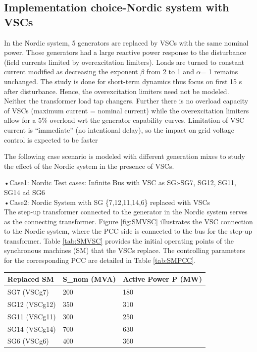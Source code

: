\documentclass{report}
\begin{document}
\subsection{Implementation choice-Nordic system with VSCs}
In the Nordic system, 5 generators are replaced by VSCs with the same nominal power. Those generators had a large reactive power response to the disturbance (field currents limited by overexcitation limiters).  Loads are turned to constant current modified as decreasing the exponent $\beta$  from 2 to 1 and $\alpha$= 1 remains unchanged. The study is done for short-term dynamics thus focus on first 15 s after disturbance. Hence, the overexcitation limiters need not be modeled. Neither the transformer load tap changers. Further there is no overload capacity of VSCs (maximum current = nominal current) while the overexcitation limiters allow for a 5\% overload wrt the generator capability curves. Limitation of VSC current is “immediate” (no intentional delay), so the impact on grid voltage control is expected to be faster

The following case scenario is modeled with different generation mixes to study the effect of the Nordic system in the presence of VSCs.

•Case1: Nordic Test cases: Infinite Bus with VSC as SG:-SG7, SG12, SG11, SG14 ad SG6\\
•Case2: Nordic System with SG \{7,12,11,14,6\} replaced with VSCs\\

The step-up transformer connected to the generator in the Nordic system serves as the connecting transformer. Figure \ref{fig:SMVSC} illustrates the VSC connection to the Nordic system, where the PCC side is connected to the bus for the step-up transformer. Table \ref{tab:SMVSC} provides the initial operating points of the synchronous machines (SM) that the VSCs replace. The controlling parameters for the corresponding PCC are detailed in Table \ref{tab:SMPCC}.
\begin{table}[H]
\centering
\begin{tabular}{|l |l |l|}
\hline
Replaced SM & S\_nom (MVA) & Active Power P (MW) \\
\hline
SG7 (VSCg7) & 200 & 180 \\
SG12 (VSCg12) & 350 & 310 \\
SG11 (VSCg11) & 300 & 250 \\
SG14 (VSCg14) & 700 & 630 \\
SG6 (VSCg6) & 400 & 360 \\
\hline
\end{tabular}
\end{table}
\end{document}

